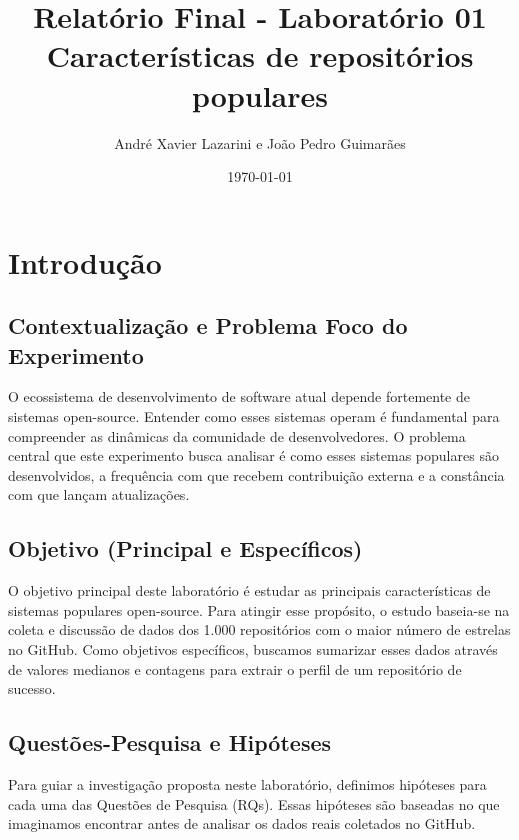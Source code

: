 \documentclass[12pt,a4paper]{article}
\title{Relatório Final - Laboratório 01\\ \large Características de repositórios populares}
\author{André Xavier Lazarini e João Pedro Guimarães}
\date{\today}
\begin{document}
\maketitle

\section{Introdução}

\subsection*{Contextualização e Problema Foco do Experimento}
O ecossistema de desenvolvimento de software atual depende fortemente de sistemas open-source. Entender como esses sistemas operam é fundamental para compreender as dinâmicas da comunidade de desenvolvedores. O problema central que este experimento busca analisar é como esses sistemas populares são desenvolvidos, a frequência com que recebem contribuição externa e a constância com que lançam atualizações.

\subsection*{Objetivo (Principal e Específicos)}
O objetivo principal deste laboratório é estudar as principais características de sistemas populares open-source. Para atingir esse propósito, o estudo baseia-se na coleta e discussão de dados dos 1.000 repositórios com o maior número de estrelas no GitHub. Como objetivos específicos, buscamos sumarizar esses dados através de valores medianos e contagens para extrair o perfil de um repositório de sucesso.

\subsection*{Questões-Pesquisa e Hipóteses}
Para guiar a investigação proposta neste laboratório, definimos hipóteses para cada uma das Questões de Pesquisa (RQs). Essas hipóteses são baseadas no que imaginamos encontrar antes de analisar os dados reais coletados no GitHub.
\end{document}

